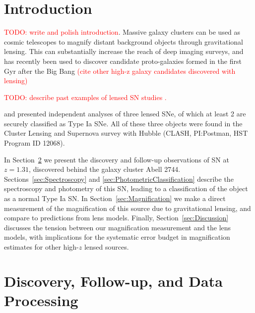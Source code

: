 
\section{Introduction}
\label{sec:Introduction}

\textcolor{red}{TODO: write and polish introduction}.
Massive galaxy clusters can be used as cosmic telescopes to magnify
distant background objects through gravitational lensing.  This can
substantially increase the reach of deep imaging surveys, and has
recently been used to discover candidate proto-galaxies formed in the
first Gyr after the Big 
Bang \citep{Zheng:2012,Coe:2013} 
\textcolor{red}{(cite other high-z galaxy candidates discovered with lensing)}

\textcolor{red}{TODO: describe past examples of lensed SN studies  \citep{Goobar:2009,Riehm:2011,Quimby:2014}.}

\citet[][hereafter P14]{Patel:2014} and \citet{Nordin:2014} presented
independent analyses of three lensed SNe, of which at least 2 are securely
classified as Type Ia SNe.  All of these three objects were found in
the Cluster Lensing and Supernova survey with Hubble (CLASH,
PI:Postman, HST Program ID 12068). 


In Section~\ref{sec:DiscoveryAndFollowup} we present the discovery and
follow-up observations of SN \tomas at $z=1.31$, discovered behind the
galaxy cluster Abell 2744.  Sections~\ref{sec:Spectroscopy} and \ref{sec:PhotometricClassification}
describe the spectroscopy and photometry of this SN, leading to a
classification of the object as a normal Type Ia SN.  In
Section~\ref{sec:Magnification} we make a direct measurement of
the magnification of this source due to gravitational lensing, and
compare to predictions from lens models.  Finally,
Section~\ref{sec:Discussion} discusses the tension between our
magnification measurement and the lens models, with implications for
the systematic error budget in magnification estimates for other
high-$z$ lensed sources.


\section{Discovery, Follow-up, and Data Processing}
\label{sec:DiscoveryAndFollowup}

